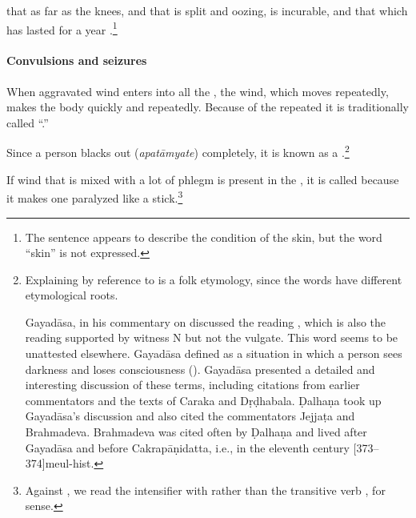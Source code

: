 \begin{translation}
\item[49ab, 50ab]

 that  as far as
the knees, and that is split and oozing, is incurable, and that which
has lasted for a year .\footnote{The
    sentence appears to describe the condition of the skin, but the word
    “skin” is not expressed.}
  
\paragraph{Convulsions and seizures}

\item[50cd--51]

When aggravated wind enters into all the , the
wind, which moves repeatedly, makes the body 
quickly and repeatedly. Because of the repeated
 it is traditionally called “.”


\item[52--56]

	Since a person blacks out (\emph{apatāmyate}) completely, it is known
as a .\label{apatānaka}\footnote{Explaining
     by reference to  is a folk etymology,
    since the words have different etymological roots.
    
    Gayadāsa, in his commentary on  discussed the
reading , which is also the  reading supported by
witness N but not the vulgate.  This word seems to be unattested
elsewhere.  Gayadāsa defined  as a situation in which
a person sees darkness and loses consciousness (). Gayadāsa presented a detailed and interesting
discussion of these terms, including citations from earlier
commentators and the texts of Caraka and Dṛḍhabala. Ḍalhaṇa took
up Gayadāsa's discussion and also cited the commentators Jejjaṭa
and Brahmadeva. Brahmadeva was cited often by Ḍalhaṇa and lived
after Gayadāsa and before Cakrapāṇidatta, i.e., in the eleventh
century [373--374]{meul-hist}.\label{Brahmadeva}}

\item[52cd--53ab] 

If wind that is mixed with a lot of phlegm is present in
the , it is called  because it makes one paralyzed like a stick.\footnote{Against
    , we read the intensifier  with 
     rather
    than the transitive verb , for sense.
    
}
\end{translation}
